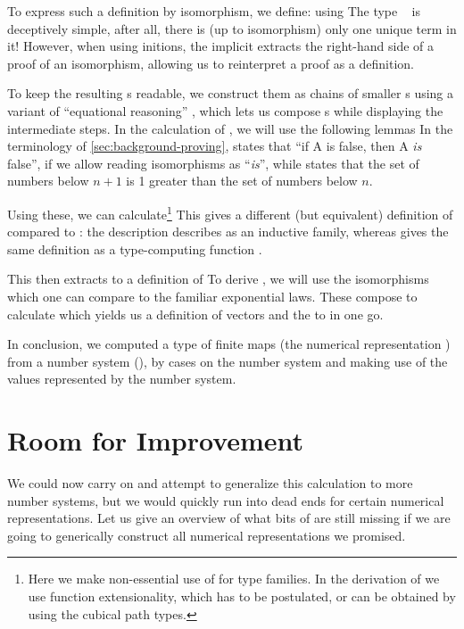 To express such a definition by isomorphism, we define:
using
The type \  is deceptively simple, after all, there is (up to isomorphism) only one unique term in it! However, when using initions, the implicit  extracts the right-hand side of a proof of an isomorphism, allowing us to reinterpret a proof as a definition.

To keep the resulting s readable, we construct them as chains of smaller s using a variant of ``equational reasoning'' \cite{agdastdlib, plfa}, which lets us compose s while displaying the intermediate steps. In the calculation of , we will use the following lemmas
In the terminology of \autoref{sec:background-proving},  states that ``if A is false, then A \emph{is} false'', if we allow reading isomorphisms as ``\emph{is}'', while  states that the set of numbers below $n+1$ is 1 greater than the set of numbers below $n$.

Using these, we can calculate\footnote{Here we make non-essential use of  for type families. In the derivation of  we use function extensionality, which has to be postulated, or can be obtained by using the cubical path types.}
This gives a different (but equivalent) definition of  compared to : the description  describes  as an inductive family, whereas  gives the same definition as a type-computing function \cite{progorn}.

This  then extracts to a definition of 
To derive , we will use the isomorphisms
which one can compare to the familiar exponential laws. These compose to calculate
which yields us a definition of vectors
and the  to  in one go.

In conclusion, we computed a type of finite maps (the numerical representation ) from a number system (\bN{}), by cases on the number system and making use of the values represented by the number system.


\section{Room for Improvement}
We could now carry on and attempt to generalize this calculation to more number systems, but we would quickly run into dead ends for certain numerical representations. Let us give an overview of what bits of  are still missing if we are going to generically construct all numerical representations we promised.

